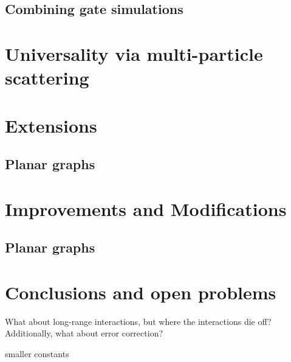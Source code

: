 \documentclass[../thesis-main/thesis-main]{subfiles}
\begin{document}
\subsection{Combining gate simulations}

%

\section{Universality via multi-particle scattering}




%

\section{Extensions}

\subsection{Planar graphs}


\section{Improvements and Modifications}


\subsection{Planar graphs}


\section{Conclusions and open problems}

What about long-range interactions, but where the interactions die off?
Additionally, what about error correction?

smaller constants

\biblio{}
\end{document}
